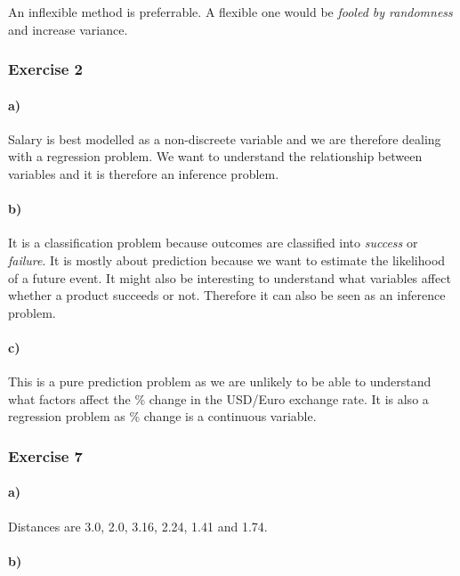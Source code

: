 \documentclass[10pt,a4paper]{article}
\begin{document}
An inflexible method is preferrable. A flexible one would be
\textit{fooled by randomness} and increase variance.

\subsubsection{Exercise 2}

\paragraph{a)}

Salary is best modelled as a non-discreete variable and we are
therefore dealing with a regression problem. We want to understand the
relationship between variables and it is therefore an inference
problem.

\paragraph{b)}

It is a classification problem because outcomes are classified into
\textit{success} or \textit{failure}. It is mostly about prediction
because we want to estimate the likelihood of a future event. It might
also be interesting to understand what variables affect whether a
product succeeds or not. Therefore it can also be seen as an inference
problem.

\paragraph{c)}

This is a pure prediction problem as we are unlikely to be able to
understand what factors affect the \% change in the USD/Euro exchange
rate. It is also a regression problem as \% change is a continuous
variable.

\subsubsection{Exercise 7}

\paragraph{a)}

Distances are 3.0, 2.0, 3.16, 2.24, 1.41 and 1.74.

\paragraph{b)}
\end{document}

